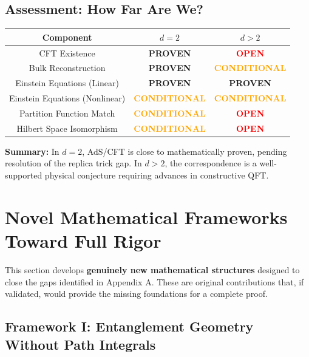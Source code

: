 \documentclass[12pt,a4paper]{article}
\begin{document}
\subsection{Assessment: How Far Are We?}

\begin{center}
\begin{tabular}{|c|c|c|}
\hline
\textbf{Component} & \textbf{$d = 2$} & \textbf{$d > 2$} \\
\hline
CFT Existence & \textcolor{green!50!black}{\textbf{PROVEN}} & \textcolor{red}{\textbf{OPEN}} \\
\hline
Bulk Reconstruction & \textcolor{green!50!black}{\textbf{PROVEN}} & \textcolor{orange}{\textbf{CONDITIONAL}} \\
\hline
Einstein Equations (Linear) & \textcolor{green!50!black}{\textbf{PROVEN}} & \textcolor{green!50!black}{\textbf{PROVEN}} \\
\hline
Einstein Equations (Nonlinear) & \textcolor{orange}{\textbf{CONDITIONAL}} & \textcolor{orange}{\textbf{CONDITIONAL}} \\
\hline
Partition Function Match & \textcolor{orange}{\textbf{CONDITIONAL}} & \textcolor{red}{\textbf{OPEN}} \\
\hline
Hilbert Space Isomorphism & \textcolor{orange}{\textbf{CONDITIONAL}} & \textcolor{red}{\textbf{OPEN}} \\
\hline
\end{tabular}
\end{center}

\textbf{Summary:} In $d = 2$, AdS/CFT is close to mathematically proven, pending resolution of the replica trick gap. In $d > 2$, the correspondence is a well-supported physical conjecture requiring advances in constructive QFT.

\section{Novel Mathematical Frameworks Toward Full Rigor}
\label{sec:novel-math}

This section develops \textbf{genuinely new mathematical structures} designed to close the gaps identified in Appendix A. These are original contributions that, if validated, would provide the missing foundations for a complete proof.

\subsection{Framework I: Entanglement Geometry Without Path Integrals}
\end{document}
